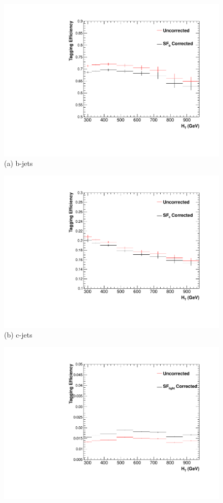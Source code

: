 \begin{figure}[ht]
\centering
\begin{minipage}[b]{0.48 \linewidth}
\includegraphics[width = 1.0\linewidth]{plots/b_jet_HTDistribution.pdf}
\centering (a)  b-jets
\end{minipage}
\quad
\begin{minipage}[b]{0.48\linewidth}
\includegraphics[width = 1.0\linewidth]{plots/c_jet_HTDistribution.pdf}
\centering (b) c-jets
\end{minipage}
\quad
\begin{minipage}[b]{0.48\linewidth}
\centering
\includegraphics[width = 1.0\linewidth]{plots/light_jet_HTDistribution.pdf}

\end{minipage}
\end{figure}
